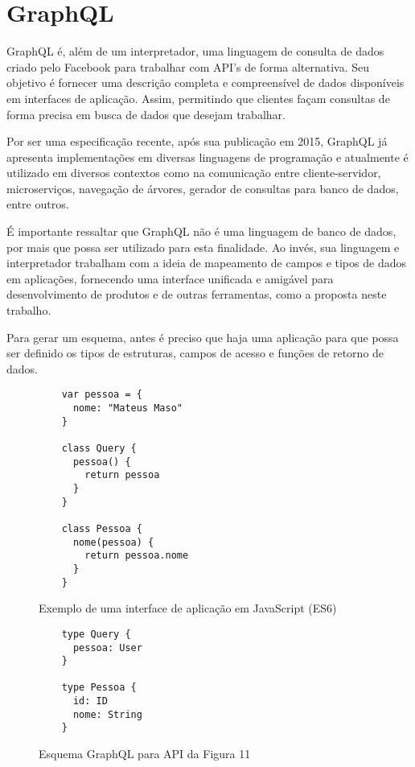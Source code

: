 \chapter{GraphQL}

GraphQL é, além de um interpretador, uma linguagem de consulta de dados criado pelo Facebook para trabalhar com API's de forma alternativa. Seu objetivo é fornecer uma descrição completa e compreensível de dados disponíveis em interfaces de aplicação. Assim, permitindo que clientes façam consultas de forma precisa em busca de dados que desejam trabalhar. \cite{GraphQL2016}

Por ser uma especificação recente, após sua publicação em 2015, GraphQL já apresenta implementações em diversas linguagens de programação e atualmente é utilizado em diversos contextos como na comunicação entre cliente-servidor, microserviços, navegação de árvores, gerador de consultas para banco de dados, entre outros.

É importante ressaltar que GraphQL não é uma linguagem de banco de dados, por mais que possa ser utilizado para esta finalidade. Ao invés, sua linguagem e interpretador trabalham com a ideia de mapeamento de campos e tipos de dados em aplicações, fornecendo uma interface unificada e amigável para desenvolvimento de produtos e de outras ferramentas, como a proposta neste trabalho. \cite{GraphQL2016}

Para gerar um esquema, antes é preciso que haja uma aplicação para que possa ser definido os tipos de estruturas, campos de acesso e funções de retorno de dados.

\begin{figure}[H]
  \centering
  \begin{verbatim}
    var pessoa = {
      nome: "Mateus Maso"
    }

    class Query {
      pessoa() {
        return pessoa
      }
    }

    class Pessoa {
      nome(pessoa) {
        return pessoa.nome
      }
    }
  \end{verbatim}
  \caption{Exemplo de uma interface de aplicação em JavaScript (ES6)}
\end{figure}

\begin{figure}[H]
  \centering
  \begin{verbatim}
    type Query {
      pessoa: User
    }

    type Pessoa {
      id: ID
      nome: String
    }
  \end{verbatim}
  \caption{Esquema GraphQL para API da Figura 11}
\end{figure}

